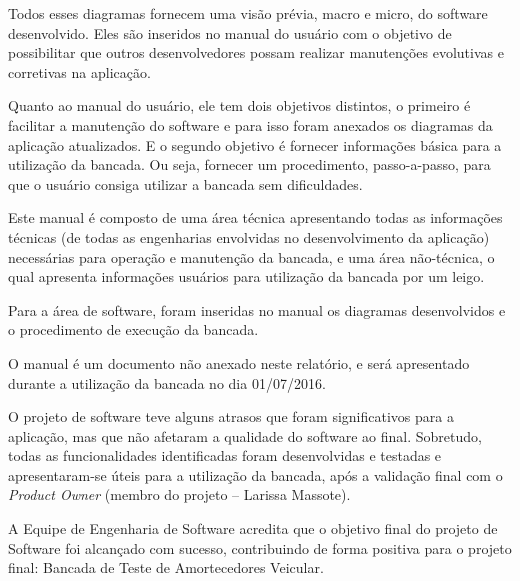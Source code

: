 		Todos esses diagramas fornecem uma visão prévia, macro e micro, do software desenvolvido. Eles são inseridos no manual do usuário com o objetivo de possibilitar que outros desenvolvedores possam realizar manutenções evolutivas e corretivas na aplicação.
		
		Quanto ao manual do usuário, ele tem dois objetivos distintos, o primeiro é facilitar a manutenção do software e para isso foram anexados os diagramas da aplicação atualizados. E o segundo objetivo é fornecer informações básica para a utilização da bancada. Ou seja, fornecer um procedimento, passo-a-passo, para que o usuário consiga utilizar a bancada sem dificuldades.
		
		Este manual é composto de uma área técnica apresentando todas as informações técnicas (de todas as engenharias envolvidas no desenvolvimento da aplicação) necessárias para operação e manutenção da bancada, e uma área não-técnica, o qual apresenta informações usuários para utilização da bancada por um leigo.
		
		Para a área de software, foram inseridas no manual os diagramas desenvolvidos e o procedimento de execução da bancada.
		
		O manual é um documento não anexado neste relatório, e será apresentado durante a utilização da bancada no dia 01/07/2016.


		O projeto de software teve alguns atrasos que foram significativos para a aplicação, mas que não afetaram a qualidade do software ao final. Sobretudo, todas as funcionalidades identificadas foram desenvolvidas e testadas e apresentaram-se úteis para a utilização da bancada, após a validação final com o \textit{Product Owner} (membro do projeto – Larissa Massote).
		
		A Equipe de Engenharia de Software acredita que o objetivo final do projeto de Software foi alcançado com sucesso, contribuindo de forma positiva para o projeto final: Bancada de Teste de Amortecedores Veicular. 